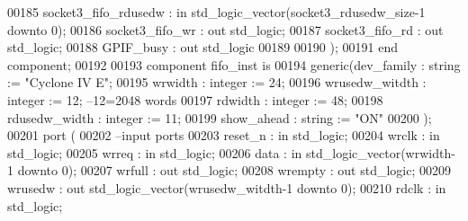 \begin{DoxyCode}
00185         socket3_fifo_rdusedw        : \textcolor{keywordflow}{in} \textcolor{comment}{std\_logic\_vector}(socket3_rdusedw_size\textcolor{vhdlchar}{-}\textcolor{vhdllogic}{}\textcolor{vhdllogic}{1} \textcolor{keywordflow}{downto} \textcolor{vhdllogic}{}\textcolor{vhdllogic}{0});
00186         socket3_fifo_wr         : \textcolor{keywordflow}{out} \textcolor{comment}{std\_logic};
00187         socket3_fifo_rd         : \textcolor{keywordflow}{out} \textcolor{comment}{std\_logic};
00188         GPIF_busy                   : \textcolor{keywordflow}{out} \textcolor{comment}{std\_logic}
00189 
00190         );
00191 \textcolor{keywordflow}{end} \textcolor{keywordflow}{component};
00192 
00193 \textcolor{keywordflow}{component} fifo_inst \textcolor{keywordflow}{is}
00194   \textcolor{keywordflow}{generic}(dev_family         : \textcolor{comment}{string}  := \textcolor{keyword}{"Cyclone IV E"};
00195           wrwidth         : \textcolor{comment}{integer} := \textcolor{vhdllogic}{}\textcolor{vhdllogic}{24};
00196           wrusedw_witdth  : \textcolor{comment}{integer} := \textcolor{vhdllogic}{}\textcolor{vhdllogic}{12}; \textcolor{keyword}{--12=2048 words }
00197           rdwidth         : \textcolor{comment}{integer} := \textcolor{vhdllogic}{}\textcolor{vhdllogic}{48};
00198           rdusedw_width   : \textcolor{comment}{integer} := \textcolor{vhdllogic}{}\textcolor{vhdllogic}{11};
00199           show_ahead      : \textcolor{comment}{string}  := \textcolor{keyword}{"ON"}
00200   );  
00201   \textcolor{keywordflow}{port} (
00202 \textcolor{keyword}{      --input ports }
00203       reset_n       : \textcolor{keywordflow}{in} \textcolor{comment}{std\_logic};
00204       wrclk         : \textcolor{keywordflow}{in} \textcolor{comment}{std\_logic};
00205       wrreq         : \textcolor{keywordflow}{in} \textcolor{comment}{std\_logic};
00206       data          : \textcolor{keywordflow}{in} \textcolor{comment}{std\_logic\_vector}(wrwidth\textcolor{vhdlchar}{-}\textcolor{vhdllogic}{}\textcolor{vhdllogic}{1} \textcolor{keywordflow}{downto} \textcolor{vhdllogic}{}\textcolor{vhdllogic}{0});
00207       wrfull        : \textcolor{keywordflow}{out} \textcolor{comment}{std\_logic};
00208         wrempty       : \textcolor{keywordflow}{out} \textcolor{comment}{std\_logic};
00209       wrusedw       : \textcolor{keywordflow}{out} \textcolor{comment}{std\_logic\_vector}(wrusedw_witdth\textcolor{vhdlchar}{-}\textcolor{vhdllogic}{}\textcolor{vhdllogic}{1} \textcolor{keywordflow}{downto} \textcolor{vhdllogic}{}\textcolor{vhdllogic}{0});
00210       rdclk          : \textcolor{keywordflow}{in} \textcolor{comment}{std\_logic};

\end{DoxyCode}
